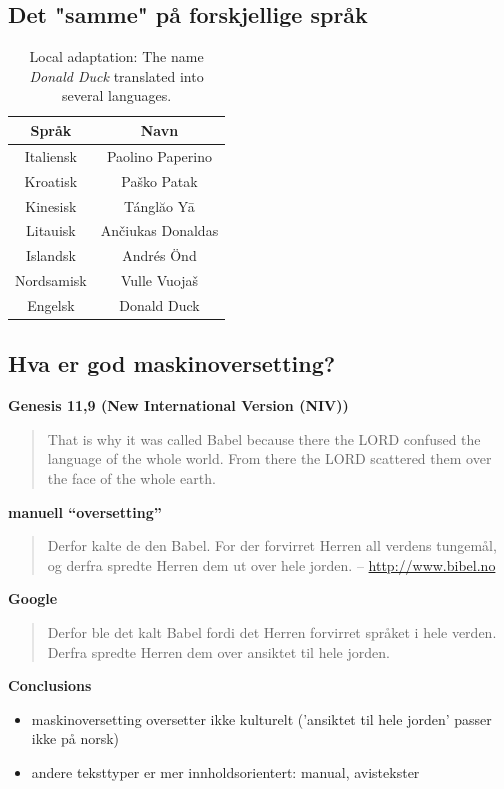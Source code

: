 \documentclass[a4paper,english,12pt]{article}
\begin{document}
\begin{spacing}{1.0}
\subsection{Det "samme" på forskjellige språk}
\begin{table}
\centering
\begin{tabular}{|c|c|}
\hline
\textbf{Språk} & \textbf{Navn} \\
\hline
Italiensk &  Paolino Paperino  \\
\hline
Kroatisk &  Paško Patak  \\
\hline
Kinesisk & Tánglăo Yā \\
\hline
Litauisk & Ančiukas Donaldas \\
\hline
Islandsk & Andrés Önd \\
\hline
Nordsamisk & Vulle Vuojaš \\
\hline
Engelsk & Donald Duck \\
\hline
\end{tabular}
\caption{Local adaptation: The name \emph{Donald Duck} translated into several languages.}
\end{table}
 

\subsection{Hva er god maskinoversetting?}

\textbf{Genesis 11,9 (New International Version (NIV))}
\begin{quote}
That is why it was called Babel because there the LORD confused the language of the whole world. From 
there the LORD scattered them over the face of the whole earth.
\end{quote}

\textbf{manuell ``oversetting''}
\begin{quote}
Derfor kalte de den Babel. For der forvirret Herren all verdens tungemål, og derfra spredte Herren dem ut over hele jorden.
-- \url{http://www.bibel.no}
\end{quote}

\textbf{Google}
\begin{quote}
Derfor ble det kalt Babel fordi det Herren forvirret språket i hele verden. Derfra spredte Herren dem over ansiktet til hele jorden.
\end{quote}
 
\textbf{Conclusions} 
\begin{itemize}
\item maskinoversetting oversetter ikke kulturelt ('ansiktet til hele jorden' passer ikke på norsk)
\item andere teksttyper er mer innholdsorientert: manual, avistekster
\end{itemize} 
 

\end{spacing}
\end{document}
